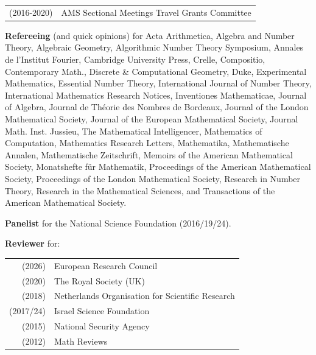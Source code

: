 \documentclass[margin,line]{res}
\begin{document}
\begin{resume}
\begin{tabular}{ll}
(2016-2020) & AMS Sectional Meetings Travel Grants Committee \\
\end{tabular}

\textbf{Refereeing} (and quick opinions) for 
Acta Arithmetica,
Algebra and Number Theory, 
Algebraic Geometry,
Algorithmic Number Theory Symposium,  
Annales de l'Institut Fourier,
Cambridge University Press,
Crelle, 
Compositio,
Contemporary Math., 
Discrete \& Computational Geometry,
Duke,
Experimental Mathematics,
Essential Number Theory,
International Journal of Number Theory, 
International Mathematics Research Notices,
Inventiones Mathematicae, 
Journal of Algebra, 
Journal de  Th\'eorie des Nombres de Bordeaux,
Journal of the London Mathematical Society,
Journal of the European Mathematical Society,
Journal Math. Inst. Jussieu,
The Mathematical Intelligencer, %
Mathematics of Computation, 
Mathematics Research Letters,
Mathematika,
Mathematische Annalen,
Mathematische Zeitschrift,
Memoirs of the American Mathematical Society, %
Monatshefte für Mathematik,
Proceedings of the American Mathematical Society,
Proceedings of the London Mathematical Society, 
Research in Number Theory, 
Research in the Mathematical Sciences,
and 
Transactions of the American Mathematical Society.


\textbf{Panelist} for the National Science Foundation (2016/19/24).

\vspace{-5pt}
\textbf{Reviewer} for:
\vspace{-4pt}

\begin{tabular}{rl}
(2026) & European Research Council\\
(2020) & The Royal Society (UK)  \\
(2018) & Netherlands Organisation for Scientific Research\\
(2017/24) & Israel Science Foundation \\
(2015) & National Security Agency \\
(2012) & Math Reviews\\
\end{tabular}
\vspace{.05in} 



\end{resume}
\end{document}
